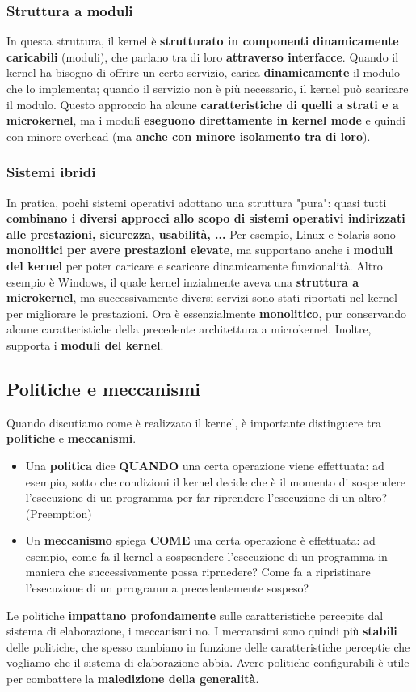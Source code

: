 \documentclass[12pt]{article}
\begin{document}
\subsubsection{Struttura a moduli}
In questa struttura, il kernel è \textbf{strutturato in componenti dinamicamente caricabili} (moduli), che parlano tra di loro \textbf{attraverso interfacce}.
Quando il kernel ha bisogno di offrire un certo servizio, carica \textbf{dinamicamente} il modulo che lo implementa; quando il servizio non è più necessario, il kernel può scaricare il modulo.
Questo approccio ha alcune \textbf{caratteristiche di quelli a strati e a microkernel}, ma i moduli \textbf{eseguono direttamente in kernel mode} e quindi con minore overhead (ma \textbf{anche con minore isolamento tra di loro}).
\subsubsection{Sistemi ibridi}
In pratica, pochi sistemi operativi adottano una struttura "pura": quasi tutti \textbf{combinano i diversi approcci allo scopo di sistemi operativi indirizzati alle prestazioni, sicurezza, usabilità, ...}
Per esempio, Linux e Solaris sono \textbf{monolitici per avere prestazioni elevate}, ma supportano anche i \textbf{moduli del kernel} per poter caricare e scaricare dinamicamente funzionalità.
Altro esempio è Windows, il quale kernel inzialmente aveva una \textbf{struttura a microkernel}, ma successivamente diversi servizi sono stati riportati nel kernel per migliorare le prestazioni.
Ora è essenzialmente \textbf{monolitico}, pur conservando alcune caratteristiche della precedente architettura a microkernel. Inoltre, supporta i \textbf{moduli del kernel}.
\subsection{Politiche e meccanismi}
Quando discutiamo come è realizzato il kernel, è importante distinguere tra \textbf{politiche} e \textbf{meccanismi}.
\begin{itemize}
    \item Una \textbf{politica} dice \textbf{QUANDO} una certa operazione viene effettuata: ad esempio, sotto che condizioni il kernel decide che è il momento di sospendere l'esecuzione di un programma per far riprendere l'esecuzione di un altro? (Preemption)
    \item Un \textbf{meccanismo} spiega \textbf{COME} una certa operazione è effettuata: ad esempio, come fa il kernel a sospsendere l'esecuzione di un programma in maniera che successivamente possa riprnedere? Come fa a ripristinare l'esecuzione di un prrogramma precedentemente sospeso?
\end{itemize}
Le politiche \textbf{impattano profondamente} sulle caratteristiche percepite dal sistema di elaborazione, i meccanismi no.
I meccansimi sono quindi più \textbf{stabili} delle politiche, che spesso cambiano in funzione delle caratteristiche perceptie che vogliamo che il sistema di elaborazione abbia.
Avere politiche configurabili è utile per combattere la \textbf{maledizione della generalità}.
\end{document}
